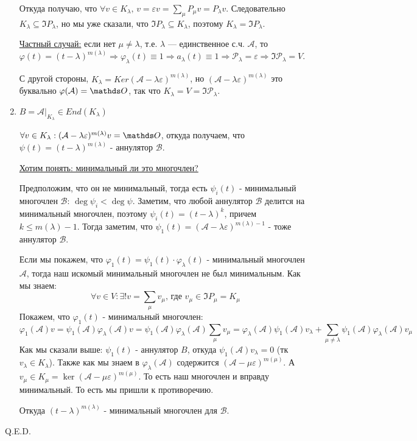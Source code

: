 \begin{enumerate}
    Откуда получаю, что $\forall v \in K_{\lambda}, \, v= \varepsilon v = \sum\limits_{\mu}P_{\mu}v=P_{\lambda}v$. Следовательно $ K_{\lambda }\subseteq \Im P_{\lambda}$, но мы уже сказали, что  $ \Im P_{\lambda} \subseteq K_{\lambda}$, поэтому $ K_{\lambda }= \Im P_{\lambda}$.

    \uline{Частный случай:} если нет $\mu \ne \lambda$, т.е. $\lambda$ --- единственное с.ч. $\mathcal{A}$, то $\varphi(t) = (t - \lambda)^{m(\lambda)} \Rightarrow \varphi_{\lambda}(t) \equiv 1 \Rightarrow a_{\lambda}(t) \equiv 1 \Rightarrow \mathcal{P}_{\lambda} = \varepsilon \Rightarrow \Im\mathcal{P}_{\lambda} = V$.

    С другой стороны, $K_{\lambda} = Ker(\mathcal{A} - \lambda\varepsilon)^{m(\lambda)}$, но $(\mathcal{A} - \lambda\varepsilon)^{m(\lambda)}$ это буквально $\varphi(\mathcal{A}) = \zero$, так что $K_{\lambda} = V = \Im\mathcal{P}_{\lambda}$.


    \item $B = \mathcal{A}\Big|_{K_{\lambda}}\in End(K_{\lambda})$

    $\forall v \in K_{\lambda}:(\mathcal{A}-\lambda \varepsilon)^{m(\lambda)}v = \zero$, откуда получаем, что $\psi(t) = (t-\lambda)^{m(\lambda)}$ - аннулятор $\mathcal{B}$.

    \uline{Хотим понять: минимальный ли это многочлен?}

    Предположим, что он не минимальный, тогда есть $\psi_i(t)$ - минимальный многочлен $\mathcal{B}$: $\deg \psi_i <\deg \psi$. Заметим, что любой аннулятор $\mathcal{B}$ делится на минимальный многочлен, поэтому $\psi_i(t) =(t-\lambda )^{k}$, причем $k \leq m(\lambda)-1$. Тогда заметим, что $\psi_1(t) = (\mathcal{A}-\lambda \varepsilon)^{m(\lambda)-1}$ - тоже аннулятор $\mathcal{B}$.

    Если мы покажем, что $\varphi_1(t)=\psi_1(t)\cdot \varphi_{\lambda}(t)$ - минимальный многочлен $\mathcal{A}$, тогда наш искомый минимальный многочлен не был минимальным. Как мы знаем:
    $$\forall v \in V: \exists! v =\sum\limits_{\mu} v_{\mu}\text{, где }v_{\mu}\in \Im P_\mu =  K_\mu$$
    Покажем, что $\varphi_1(t)$ - минимальный многочлен:
$$\varphi_1(\mathcal{A})v=\psi_1(\mathcal{A}) \varphi_{\lambda}(\mathcal{A})v = \psi_1(\mathcal{A}) \varphi_{\lambda}(\mathcal{A})\sum\limits_{\mu} v_{\mu} = \varphi_{\lambda}(\mathcal{A})\psi_1(\mathcal{A})v_\lambda + \sum\limits_{\mu\neq \lambda}\psi_1(\mathcal{A}) \varphi_{\lambda}(\mathcal{A}) v_{\mu}$$
Как мы сказали выше: $\psi_1(t)$ - аннулятор $B$, откуда $\psi_1(\mathcal{A})v_{\lambda} = 0$ (тк $v_\lambda \in K_\lambda$). Также как мы знаем в $\varphi_\lambda(\mathcal{A})$ содержится $(\mathcal{A}-\mu\varepsilon)^{m(\mu)}$. А $v_{\mu} \in K_{\mu} = \ker (\mathcal{A}-\mu\varepsilon)^{m(\mu)}$. То есть наш многочлен и вправду минимальный. То есть мы пришли к противоречию.

Откуда $(t-\lambda)^{m(\lambda)}$ - минимальный многочлен для $\mathcal{B}$.

\end{enumerate}
 \hfill Q.E.D.


